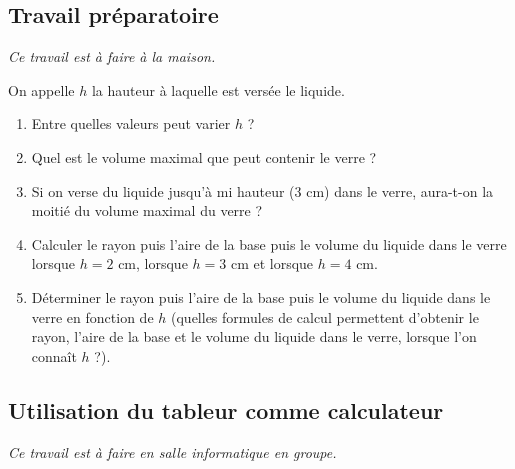 \subsection{Travail pr\'eparatoire}

\emph{Ce travail est \`a faire \`a la maison.}


On appelle $h$ la hauteur \`a laquelle est vers\'ee le liquide.
\begin{enumerate}
	\item Entre quelles valeurs peut varier $h$ ?
	\item Quel est le volume maximal que peut contenir le verre ?
	\item Si on verse du liquide jusqu'\`a mi hauteur (3 cm) dans le verre, aura-t-on la moiti\'e du volume maximal du verre ?
	\item \label{fgq1} Calculer le rayon puis l'aire de la base puis le volume du liquide dans le verre lorsque $h=2$ cm, lorsque $h=3$ cm et lorsque $h=4$ cm.
	\item D\'eterminer le rayon puis l'aire de la base puis le volume du liquide dans le verre en fonction de $h$
(quelles formules de calcul permettent d'obtenir le rayon, l'aire de la base et le volume du liquide dans le verre, lorsque l'on conna\^it $h$ ?).
\end{enumerate}

\subsection{Utilisation du tableur comme calculateur}

\emph{Ce travail est \`a faire en salle informatique en groupe.}

